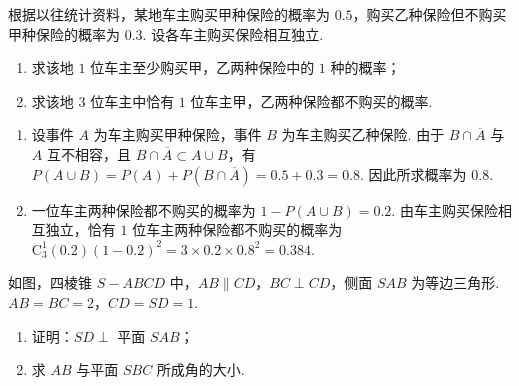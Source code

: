 \begin{problem}
根据以往统计资料，某地车主购买甲种保险的概率为 \(0.5\)，购买乙种保险但不购买甲种保险的概率为 \(0.3\). 设各车主购买保险相互独立.

\begin{enumerate}
\item 求该地 \(1\) 位车主至少购买甲，乙两种保险中的 \(1\) 种的概率；
\item 求该地 \(3\) 位车主中恰有 \(1\) 位车主甲，乙两种保险都不购买的概率.
\end{enumerate}
\end{problem}

\begin{solution}
\begin{enumerate}
\item 设事件 \(A\) 为车主购买甲种保险，事件 \(B\) 为车主购买乙种保险. 由于 \(B\cap\overline A\) 与 \(A\) 互不相容，且 \(B\cap\overline A\subset A\cup B\)，有 \(P(A\cup B)=P(A)+P(B\cap\overline A)=0.5+0.3=0.8\). 因此所求概率为 \(0.8\).
\item 一位车主两种保险都不购买的概率为 \(1-P(A\cup B)=0.2\). 由车主购买保险相互独立，恰有 \(1\) 位车主两种保险都不购买的概率为 \(\mathrm C_3^1(0.2)(1-0.2)^2=3\times0.2\times0.8^2=0.384\).
\end{enumerate}
\end{solution}

\begin{problem}
如图，四棱锥 \(S-ABCD\) 中，\(AB\parallel CD\)，\(BC\perp CD\)，侧面 \(SAB\) 为等边三角形. \(AB=BC=2\)，\(CD=SD=1\).

\begin{enumerate}
\item 证明：\(SD\perp\) 平面 \(SAB\)；
\item 求 \(AB\) 与平面 \(SBC\) 所成角的大小.
\end{enumerate}

\end{problem}


